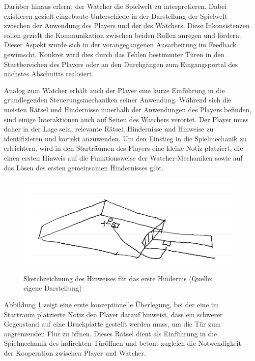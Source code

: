 Darüber hinaus erlernt der Watcher die Spielwelt zu interpretieren. Dabei existieren gezielt eingebaute Unterschiede in der Darstellung der Spielwelt zwischen der Anwendung des Players und der des Watchers. Diese Inkonsistenzen sollen gezielt die Kommunikation zwischen beiden Rollen anregen und fördern. Dieser Aspekt wurde sich in der vorangegangenen Ausarbeitung im Feedback gewünscht. Konkret wird dies durch das Fehlen bestimmter Türen in den Startbereichen des Players oder an den Durchgängen zum Eingangsportal des nächstes Abschnitts realisiert.

Analog zum Watcher erhält auch der Player eine kurze Einführung in die grundlegenden Steuerungsmechaniken seiner Anwendung. Während sich die meisten Rätsel und Hindernisse innerhalb der Anwendungen des Players befinden, sind einige Interaktionen auch auf Seiten des Watchers verortet. Der Player muss daher in der Lage sein, relevante Rätsel, Hindernisse und Hinweise zu identifizieren und korrekt anzuwenden. Um den Einstieg in die Spielmechanik zu erleichtern, wird in den Starträumen des Players eine kleine Notiz platziert, die einen ersten Hinweis auf die Funktionsweise der Watcher-Mechaniken sowie auf das Lösen des ersten gemeinsamen Hindernisses gibt.

\begin{figure}[ht]
\centering
\includegraphics[width=1\linewidth]{content/pictures/Startroom_Sketch.png}
\caption{Sketchzeichnung des Hinweises für das erste Hindernis (Quelle: eigene Darstellung)}
\label{fig:sketch-startriddle}
\end{figure}

Abbildung \ref{fig:sketch-startriddle} zeigt eine erste konzeptionelle Überlegung, bei der eine im Startraum platzierte Notiz den Player darauf hinweist, dass ein schwerer Gegenstand auf eine Druckplatte gestellt werden muss, um die Tür zum angrenzenden Flur zu öffnen. Dieses Rätsel dient als Einführung in die Spielmechanik des indirekten Türöffnen und betont zugleich die Notwendigkeit der Kooperation zwischen Player und Watcher.


